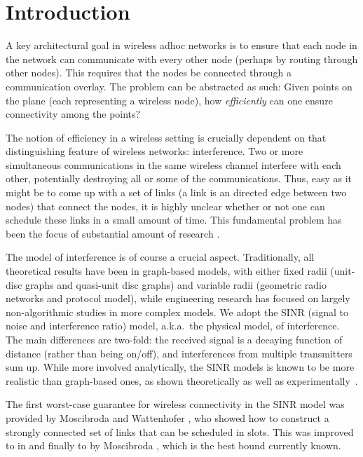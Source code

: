 \documentclass[11pt]{amsart}
\begin{document}
 


\section{Introduction}
A key architectural goal in wireless adhoc networks is to ensure that
each node in the network can communicate with every other node
(perhaps by routing through other nodes). This requires that the nodes
be connected through a communication overlay.  The problem can be
abstracted as such: Given  points on the plane (each representing a
wireless node), how \emph{efficiently} can one ensure connectivity
among the points?

The notion of efficiency in a wireless setting is crucially dependent on that distinguishing feature
of wireless networks: interference. Two or more simultaneous communications in the
same wireless channel interfere with each other, potentially destroying all or some of the communications.
Thus, easy as it might be to come up with a set of links (a link is an directed edge between two nodes) that connect the  nodes, it is highly 
unclear whether or not one can schedule these links in a small amount of time. 
This fundamental problem has been
the focus of substantial amount of research \cite{MoWa06,moscibroda06b,Moscibroda07,kumar2005,Dousse03impactof}.

The model of interference is of course a crucial
aspect. Traditionally, all theoretical results have been in graph-based
models, with either fixed radii (unit-disc graphs and quasi-unit
disc graphs) and variable radii (geometric radio networks and
protocol model), 
while engineering research has focused on largely non-algorithmic 
studies in more complex models.
We adopt the SINR (signal to noise and interference ratio) model,
a.k.a.\ the physical model, of interference. The main differences are
two-fold: the received signal is a decaying function of distance (rather than
being on/off), and interferences from multiple transmitters sum up.
While more involved analytically, the SINR models is known to
be more realistic than graph-based ones, as shown theoretically as well as
experimentally~\cite{GronkMibiHoc01,MaheshwariJD08,Moscibroda2006Protocol}.

The first worst-case guarantee for wireless connectivity 
in the SINR model was provided by Moscibroda and
Wattenhofer \cite{MoWa06}, who showed how to construct a strongly
connected set of links that can 
be scheduled in  slots. This was improved to  in \cite{moscibroda06b} and finally 
to  by Moscibroda \cite{Moscibroda07}, which is the 
best bound currently known.
\end{document}
